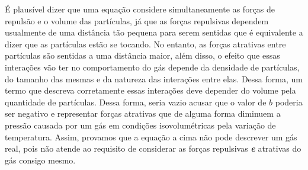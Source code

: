 \begin{rsl}
    É plausível dizer que uma equação considere simultaneamente as forças de
    repulsão e o volume das partículas, já que as forças repulsivas dependem
    usualmente de uma distância tão pequena para serem sentidas que é
    equivalente a dizer que as partículas estão se tocando. No entanto, as
    forças atrativas entre partículas são sentidas a uma distância maior, além
    disso, o efeito que essas interações vão ter no comportamento do gás depende
    da densidade de partículas, do tamanho das mesmas e da natureza das
    interações entre elas. Dessa forma, um termo que descreva corretamente essas
    interações deve depender do volume pela quantidade de partículas. Dessa
    forma, seria vazio acusar que o valor de $b$ poderia ser negativo e
    representar forças atrativas que de alguma forma diminuem a pressão causada
    por um gás em condições isovolumétricas pela variação de temperatura. Assim,
    provamos que a equação a cima não pode descrever um gás real, pois não
    atende ao requisito de considerar as forças repulsivas \textit{\textbf{e}}
    atrativas do gás consigo mesmo.   
\end{rsl}
